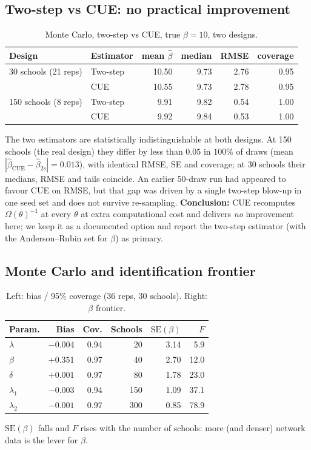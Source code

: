 \documentclass[11pt]{article}
\begin{document}
\subsection{Two-step vs CUE: no practical improvement}\label{sec:cue}
\begin{table}[h]\centering\small
\caption{Monte Carlo, two-step vs CUE, true $\beta=10$, two designs.}
\begin{tabular}{llrrrr}
\toprule
Design & Estimator & mean $\widehat\beta$ & median & RMSE & coverage \\
\midrule
30 schools (21 reps) & Two-step & 10.50 & 9.73 & 2.76 & 0.95 \\
                     & CUE      & 10.55 & 9.73 & 2.78 & 0.95 \\
\midrule
150 schools (8 reps) & Two-step & \phantom{0}9.91 & 9.82 & 0.54 & 1.00 \\
                     & CUE      & \phantom{0}9.92 & 9.84 & 0.53 & 1.00 \\
\bottomrule
\end{tabular}
\end{table}
The two estimators are statistically indistinguishable at both designs. At 150 schools (the real design) they differ by less than $0.05$ in $100\%$ of draws (mean $|\widehat\beta_{\text{CUE}}-\widehat\beta_{\text{2s}}|=0.013$), with identical RMSE, SE and coverage; at 30 schools their medians, RMSE and tails coincide. An earlier 50-draw run had appeared to favour CUE on RMSE, but that gap was driven by a single two-step blow-up in one seed set and does not survive re-sampling. \textbf{Conclusion:} CUE recomputes $\Omega(\theta)^{-1}$ at every $\theta$ at extra computational cost and delivers \emph{no} improvement here; we keep it as a documented option and report the two-step estimator (with the Anderson--Rubin set for $\beta$) as primary.

\subsection{Monte Carlo and identification frontier}
\begin{table}[h]\centering\small
\caption{Left: bias / 95\% coverage (36 reps, 30 schools). Right: $\beta$ frontier.}
\begin{tabular}{lrr@{\hspace{3em}}rrr}
\toprule
Param. & Bias & Cov. & Schools & $\mathrm{SE}(\beta)$ & $F$ \\
\midrule
$\lambda$ & $-0.004$ & 0.94 & 20 & 3.14 & 5.9 \\
$\beta$ & $+0.351$ & 0.97 & 40 & 2.70 & 12.0 \\
$\delta$ & $+0.001$ & 0.97 & 80 & 1.78 & 23.0 \\
$\lambda_1$ & $-0.003$ & 0.94 & 150 & 1.09 & 37.1 \\
$\lambda_2$ & $-0.001$ & 0.97 & 300 & 0.85 & 78.9 \\
\bottomrule
\end{tabular}
\end{table}
$\mathrm{SE}(\beta)$ falls and $F$ rises with the number of schools: more (and denser) network data is the lever for $\beta$.
\end{document}
